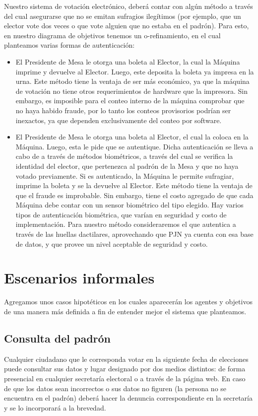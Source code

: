 \documentclass[spanish, 10pt,a4paper]{article}
\numberwithin{equation}{section} %
\begin{document}
	Nuestro sistema de votación electrónico, deberá contar con algún método a través del cual asegurarse que no se emitan sufragios ilegítimos (por ejemplo, que un elector vote dos veces o que vote alguien que no estaba en el padrón). Para esto, en nuestro diagrama de objetivos tenemos un o-refinamiento, en el cual planteamos varias formas de autenticación: 

	\begin{itemize}

		\item El Presidente de Mesa le otorga una boleta al Elector, la cual la Máquina imprime y devuelve al Elector. Luego, este deposita la boleta ya impresa en la urna. Este método tiene la ventaja de ser más económico, ya que la máquina de votación no tiene otros requerimientos de hardware que la impresora. Sin embargo, es imposible para el conteo interno de la máquina comprobar que no haya habido fraude, por lo tanto los conteos provisorios podrían ser inexactos, ya que dependen exclusivamente del conteo por software.
		\item El Presidente de Mesa le otorga una boleta al Elector, el cual la coloca en la Máquina. Luego, esta le pide que se autentique. Dicha autenticación se lleva a cabo de a través de métodos biométricos, a través del cual se verifica la identidad del elector, que pertenezca al padrón de la Mesa y que no haya votado previamente. Si es autenticado, la Máquina le permite sufragiar, imprime la boleta y se la devuelve al Elector. Este método tiene la ventaja de que el fraude es improbable. Sin embargo, tiene el costo agregado de que cada Máquina debe contar con un sensor biométrico del tipo elegido. Hay varios tipos de autenticación biométrica, que varían en seguridad y costo de implementación. Para nuestro método consideraremos el que autentica a través de las huellas dactilares, aprovechando que PJN ya cuenta con esa base de datos, y que provee un nivel aceptable de seguridad y costo.
	\end{itemize}


\section{Escenarios informales}

Agregamos unos casos hipotéticos en los cuales aparecerán los agentes y objetivos de una manera más definida a fin de entender mejor el sistema que planteamos.

\subsection{Consulta del padrón}
	Cualquier ciudadano que le corresponda votar en la siguiente fecha de elecciones puede consultar sus datos y lugar designado por dos medios distintos: de forma presencial en cualquier secretaría electoral o a través de la página web. En caso de que los datos sean incorrectos o sus datos no figuren (la persona no se encuentra en el padrón) deberá hacer la denuncia correspondiente en la secretaría y se lo incorporará a la brevedad.
	
\end{document}
